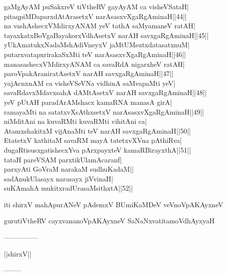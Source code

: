 \documentclass{article}
\begin{document}
gaMgAyAM puSakxreV tiVtheRV gayAyAM ca visheVSataH|\\
pitaqpiMDaparxdAtArasetxV narAsasxvXgaRgAminaH||44||\\
na vashAshecxVMdirxyANAM yeV tathA saMyamaneV ratAH|\\
tayaxkatxBoVgaBayakorxVdhAsetxV narAH savxgaRgAminaH||45||\\
yUkAmatukxNadaMshAdiVneyxV jaMtUMsutxdatasatxnuM|\\
putarxvatapxrirakaSxMti teV narAsasxvXgaRgAminaH||46||\\
manasashecxVMdirxyANAM ca savaRdA nigarxheV ratAH|\\
paroVpakAraniratAsetxV narAH savxgaRgAminaH||47||\\
yajAcnxnAM ca visheVSeVNa vidhinA saMvapaMti yeV|\\
savaRdavxMdavxsahA dAMtAsetxV narAH savxgaRgAminaH||48||\\
yeV pUtAH paradArAMshacx kamaRNA manasA girA|\\
ramayaMti na satatxvXsAthxsetxV narAsasxvXgaRgAminaH||49||\\
niMditAni na kuvaRMti kuvaRMti vihitAni ca|\\
AtamxshakitxM vijAnaMti teV narAH savxgaRgAminaH||50||\\
EtatetxV kathitaM savaRM mayA tatetxvXVna pAthiRva|\\
dugaRtisusxgatishecxYva pArxpayxteV kamaRBirayxthA||51||\\
tataH pareVSAM parxtikUlamAcaranf|\\
parxyAti GoVraM narakaM sudhuKadaM||\\
sadAnukUlasayx narasayx jiVvinaH|\\
suKAmahA mukitxradUrasaMsithxtA||52||

\begin{center}
iti shirxV mahApurANeV pAdemxV BUmiKaMDeV veVnoVpAKAyxneV
\end{center}

\begin{center}
gurutiVtheRV cayxvananoVpAKAyxneV SaNaNxvatitamoVdhAyxyaH
\end{center}

\begin{center}
---------------
\end{center}

\begin{center}
||shirxV||
\end{center}

\begin{center}
--------
\end{center}
\end{document}
